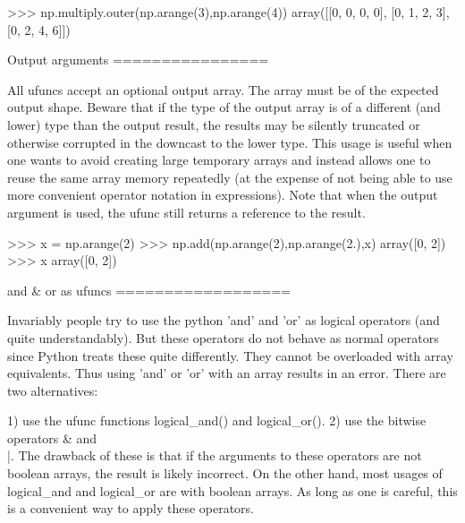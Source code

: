 \begin{DoxyVerb}
 >>> np.multiply.outer(np.arange(3),np.arange(4))
 array([[0, 0, 0, 0],
    [0, 1, 2, 3],
    [0, 2, 4, 6]])

Output arguments
================

All ufuncs accept an optional output array. The array must be of the expected
output shape. Beware that if the type of the output array is of a different
(and lower) type than the output result, the results may be silently truncated
or otherwise corrupted in the downcast to the lower type. This usage is useful
when one wants to avoid creating large temporary arrays and instead allows one
to reuse the same array memory repeatedly (at the expense of not being able to
use more convenient operator notation in expressions). Note that when the
output argument is used, the ufunc still returns a reference to the result.

 >>> x = np.arange(2)
 >>> np.add(np.arange(2),np.arange(2.),x)
 array([0, 2])
 >>> x
 array([0, 2])

and & or as ufuncs
==================

Invariably people try to use the python 'and' and 'or' as logical operators
(and quite understandably). But these operators do not behave as normal
operators since Python treats these quite differently. They cannot be
overloaded with array equivalents. Thus using 'and' or 'or' with an array
results in an error. There are two alternatives:

 1) use the ufunc functions logical_and() and logical_or().
 2) use the bitwise operators & and \\|. The drawback of these is that if
the arguments to these operators are not boolean arrays, the result is
likely incorrect. On the other hand, most usages of logical_and and
logical_or are with boolean arrays. As long as one is careful, this is
a convenient way to apply these operators.\end{DoxyVerb}
 